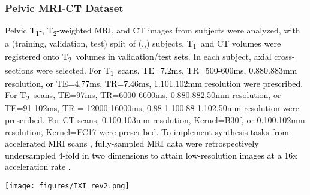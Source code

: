 \documentclass[journal,twoside,web]{ieeecolor}
\newcommand{\Tone}{T\textsubscript{1}}
\newcommand{\Ttwo}{T\textsubscript{2}}
\newcommand{\ToneTtwo}{T\textsubscript{1}T\textsubscript{2}}
\newcommand{\TtwoPD}{T\textsubscript{2}PD}
\newcommand*{\revhl}{\textcolor{black}}
\begin{document}
\subsubsection{Pelvic MRI-CT Dataset}
Pelvic \revhl{\Tone-, \Ttwo-weighted MRI, and} CT images from  subjects were analyzed, with a (training, validation, test) split of (,,) subjects. \revhl{\Tone~and CT volumes were registered onto \Ttwo~volumes in validation/test sets.} In each subject,  axial cross-sections were selected. \revhl{For \Tone~scans, TE=7.2ms, TR=500-600ms, 0.880.883mm resolution, or TE=4.77ms, TR=7.46ms, 1.101.102mm resolution were prescribed.}
For \Ttwo~scans, TE=97ms, TR=6000-6600ms, 0.880.882.50mm resolution, or TE=91-102ms, TR = 12000-16000ms, 0.88-1.100.88-1.102.50mm resolution were prescribed. For CT scans, 0.100.103mm resolution, Kernel=B30f, or 0.100.102mm resolution, Kernel=FC17 were prescribed. \revhl{To implement synthesis tasks from accelerated MRI scans \cite{kim2018,yurt2021ss}, fully-sampled MRI data were retrospectively undersampled 4-fold in two dimensions to attain low-resolution images at a 16x acceleration rate \cite{kim2018}.} 

 \begin{figure*}[t]
 \centering
 \texttt{[image: figures/IXI\_rev2.png]}
 \caption{SynDiff was demonstrated on IXI for translation between MRI contrasts. Synthesized images from competing methods are displayed along with the source and the ground-truth target (reference) images for representative \revhl{a) \ToneTtwo,} b) \TtwoPD~tasks. \revhl{Display windows of a) [0 0.65], b) [0 0.80] are used.} Compared to baselines, SynDiff yields lower noise and artifacts, and maintains higher anatomical fidelity.}
 \label{fig:IXI}
 \end{figure*}
\end{document}
